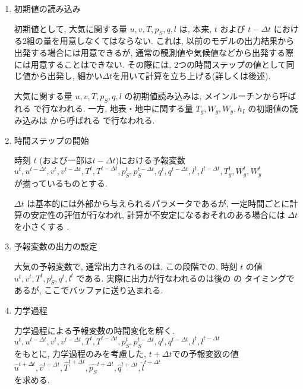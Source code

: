 \begin{enumerate}
\item 初期値の読み込み 

初期値として, 大気に関する量 $u, v, T, p_S, q, l$ は, 本来,
$t$ および $t-\Delta t$ における2組の量を用意しなくてはならない.
これは, 以前のモデルの出力結果から出発する場合には用意できるが,
通常の観測値や気候値などから出発する際には用意することはできない.
その際には, 2つの時間ステップの値として同じ値から出発し,
細かい$\Delta t$を用いて計算を立ち上げる(詳しくは後述).

大気に関する量 $u, v, T, p_S, q, l$ の初期値読み込みは,
メインルーチンから呼ばれる   で行なわれる.
一方, 地表・地中に関する量 $T_g, W_g, W_y, h_I$ の初期値の読み込みは
 から呼ばれる  で行なわれる.


\item 時間ステップの開始 

時刻 $t$ (および一部は$t-\Delta t$)における予報変数  \\
$u^{t}, u^{t-\Delta t}, v^{t}, v^{t-\Delta t},
T^{t}, T^{t-\Delta t}, p_S^{t}, p_S^{t-\Delta t},
q^{t}, q^{t-\Delta t}, l^{t}, l^{t-\Delta t},
T_g^{t}, W_g^{t}, W_y^{t}$ \\
が揃っているものとする.

$\Delta t$ は基本的には外部から与えられるパラメータであるが,
一定時間ごとに計算の安定性の評価が行なわれ,
計算が不安定になるおそれのある場合には
$\Delta t$ を小さくする .

\item 予報変数の出力の設定 

大気の予報変数で, 通常出力されるのは,
この段階での, 時刻 $t$ の値
$u^{t}, v^{t}, T^{t}, p_S^{t}, q^{t}, l^{t}$
である.
実際に出力が行なわれるのは後の  の
タイミングであるが, ここでバッファに送り込まれる.

\item 力学過程  

力学過程による予報変数の時間変化を解く. \\
$u^{t}, u^{t-\Delta t}, v^{t}, v^{t-\Delta t},
T^{t}, T^{t-\Delta t}, p_S^{t}, p_S^{t-\Delta t},
q^{t}, q^{t-\Delta t}, l^{t}, l^{t-\Delta t}$ \\
をもとに, 
力学過程のみを考慮した, $t+\Delta t$での予報変数の値 \\
$\hat{u}^{t+\Delta t}, \hat{v}^{t+\Delta t}, 
\hat{T}^{t+\Delta t}, \hat{p_S}^{t+\Delta t}, 
\hat{q}^{t+\Delta t}, \hat{l}^{t+\Delta t}$ \\
を求める.


\end{enumerate}

